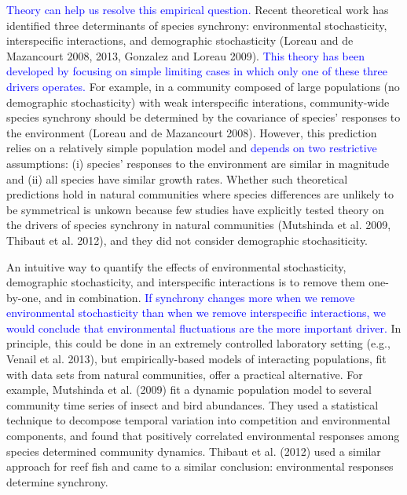 \documentclass[12pt,]{article}
\begin{document}
\textcolor{blue}{Theory can help us resolve this empirical question.}
Recent theoretical work has identified three determinants of species
synchrony: environmental stochasticity, interspecific interactions, and
demographic stochasticity (Loreau and {{de Mazancourt}} 2008, 2013,
Gonzalez and Loreau 2009).
\textcolor{blue}{This theory has been developed by focusing on simple limiting cases in which only one of these three drivers operates.}
For example, in a community composed of large populations (no
demographic stochasticity) with weak interspecific interations,
community-wide species synchrony should be determined by the covariance
of species' responses to the environment (Loreau and {{de Mazancourt}}
2008). However, this prediction relies on a relatively simple population
model and \textcolor{blue}{depends on two restrictive} assumptions: (i)
species' responses to the environment are similar in magnitude and (ii)
all species have similar growth rates. Whether such theoretical
predictions hold in natural communities where species differences are
unlikely to be symmetrical is unkown because few studies have explicitly
tested theory on the drivers of species synchrony in natural communities
(Mutshinda et al. 2009, Thibaut et al. 2012), and they did not consider
demographic stochasiticity.

An intuitive way to quantify the effects of environmental stochasticity,
demographic stochasticity, and interspecific interactions is to remove
them one-by-one, and in combination.
\textcolor{blue}{If synchrony changes more when we remove environmental stochasticity than when we remove interspecific interactions, we would conclude that environmental fluctuations are the more important driver.}
In principle, this could be done in an extremely controlled laboratory
setting (e.g., Venail et al. 2013), but empirically-based models of
interacting populations, fit with data sets from natural communities,
offer a practical alternative. For example, Mutshinda et al. (2009) fit
a dynamic population model to several community time series of insect
and bird abundances. They used a statistical technique to decompose
temporal variation into competition and environmental components, and
found that positively correlated environmental responses among species
determined community dynamics. Thibaut et al. (2012) used a similar
approach for reef fish and came to a similar conclusion: environmental
responses determine synchrony.
\end{document}
